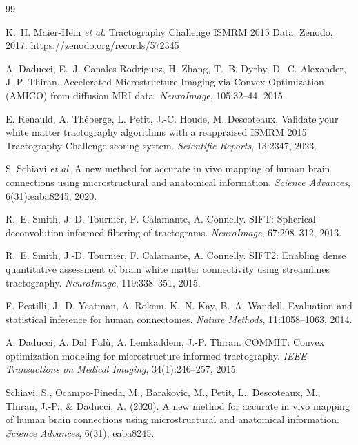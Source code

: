 \documentclass[11pt,a4paper]{article}
\begin{document}
\begin{thebibliography}{99}
\small


 K.~H. Maier-Hein \textit{et al.} Tractography Challenge ISMRM 2015 Data. Zenodo, 2017.
  \url{https://zenodo.org/records/572345}

 A. Daducci, E.~J. Canales-Rodr\'iguez, H. Zhang, T.~B. Dyrby, D.~C. Alexander, J.-P. Thiran. Accelerated Microstructure Imaging via Convex Optimization (AMICO) from diffusion MRI data. \textit{NeuroImage}, 105:32--44, 2015.

 E. Renauld, A. Th\'eberge, L. Petit, J.-C. Houde, M. Descoteaux.
  Validate your white matter tractography algorithms with a reappraised ISMRM 2015
  Tractography Challenge scoring system. \textit{Scientific Reports}, 13:2347, 2023.

 S. Schiavi \textit{et al.} A new method for accurate in vivo mapping of human brain connections using microstructural and anatomical information.
  \textit{Science Advances}, 6(31):eaba8245, 2020.


 R.~E. Smith, J.-D. Tournier, F. Calamante, A. Connelly. SIFT:
  Spherical-deconvolution informed filtering of tractograms. \textit{NeuroImage},
  67:298--312, 2013.

 R.~E. Smith, J.-D. Tournier, F. Calamante, A. Connelly. SIFT2: Enabling
  dense quantitative assessment of brain white matter connectivity using streamlines
  tractography. \textit{NeuroImage}, 119:338--351, 2015.

 F. Pestilli, J.~D. Yeatman, A. Rokem, K.~N. Kay, B.~A. Wandell.
  Evaluation and statistical inference for human connectomes. \textit{Nature Methods},
  11:1058--1063, 2014.

 A. Daducci, A. Dal~Pal\`u, A. Lemkaddem, J.-P. Thiran. COMMIT: Convex
  optimization modeling for microstructure informed tractography. \textit{IEEE Transactions
  on Medical Imaging}, 34(1):246--257, 2015.

 Schiavi, S., Ocampo-Pineda, M., Barakovic, M., Petit, L., Descoteaux, M., Thiran, J.-P., \& Daducci, A. (2020). A new method for accurate in vivo mapping of human brain connections using microstructural and anatomical information. \textit{Science Advances}, 6(31), eaba8245.


\end{thebibliography}
\end{document}
